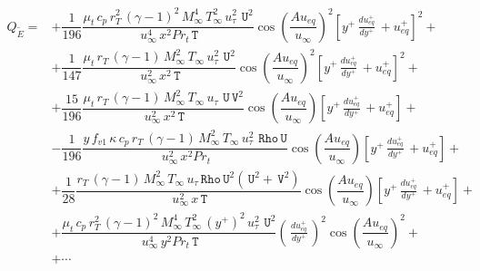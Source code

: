 \documentclass[10pt]{article}
\newcommand{\Rho}{\,\mathtt{Rho}}
\newcommand{\U}{\,\mathtt{U}}
\newcommand{\V}{\,\mathtt{V}}
\newcommand{\T}{\,\mathtt{T}}
\newcommand{\Dueqplusyplus}{\, \frac{du_{eq}^+}{dy^+}\,}
\newcommand{\tE}{\tilde{E}}
\begin{document}
\begin{equation*}
 \begin{split}
Q_{\tE}=  
&+\dfrac{1}{196} \dfrac{\mu_t\, c_p\, r_T^2 \,(\gamma-1)^2\,  M_{\infty}^4 \,T_{\infty}^2 \,u_{\tau}^2 \,\U^2}{\, u_{\infty}^4 \, x^2 Pr_t \T} \cos\left(\dfrac{A u_{eq}}{u_{\infty}}\right)^2\left[y^{+} \Dueqplusyplus+u_{eq}^{+}\right]^2 +\\ 
&+\dfrac{1}{147} \dfrac{ \mu_t\, r_T\, (\gamma-1)\, M_{\infty}^2 \,T_{\infty}\, u_{\tau}^2 \,\U^2 }{\, u_{\infty}^2 \, x^2 \T}\cos\left(\dfrac{A u_{eq}}{u_{\infty}}\right)^2 \left[y^{+} \Dueqplusyplus+u_{eq}^{+}\right]^2+ \\ 
&+\dfrac{15}{196} \dfrac{\mu_t \, r_T \,(\gamma-1)\, M_{\infty}^2 \,T_{\infty} \, u_{\tau}\, \U \V^2 }{\, u_{\infty}^2 \, x^2 \T}\cos\left(\dfrac{A u_{eq}}{u_{\infty}}\right) \left[y^{+} \Dueqplusyplus+u_{eq}^{+}\right] + \\ 
&-\dfrac{1}{196}\dfrac{ y\, f_{v1}\, \kappa \,c_p\, r_T \,(\gamma-1) \, M_{\infty}^2 \,T_{\infty} \,u_{\tau}^2\, \Rho \U}{\, u_{\infty}^2 \, x^2 Pr_t} \cos\left(\dfrac{A u_{eq}}{u_{\infty}}\right) \left[y^{+} \Dueqplusyplus+u_{eq}^{+}\right]+\\ 
&+\dfrac{1}{28} \dfrac{r_T \, (\gamma-1) \,  M_{\infty}^2 \, T_{\infty} \, u_{\tau}\Rho \U^2(\U^2+\V^2) }{\, u_{\infty}^2 \, x \T}\cos\left(\dfrac{A u_{eq}}{u_{\infty}}\right) \left[y^{+} \Dueqplusyplus+u_{eq}^{+}\right]+ \\ 
&+\dfrac{ \mu_t\, c_p \,r_T^2 \,(\gamma-1)^2\,M_{\infty}^4\, T_{\infty}^2\,( y^{+})^2 \,u_{\tau}^2 \, \U^2 }{\, u_{\infty}^4 \, y^2 Pr_t \T}\left(\Dueqplusyplus\right)^2\cos\left(\dfrac{A u_{eq}}{u_{\infty}}\right)^2+\\ 
&+\cdots
 \end{split}
\end{equation*}
\end{document}
